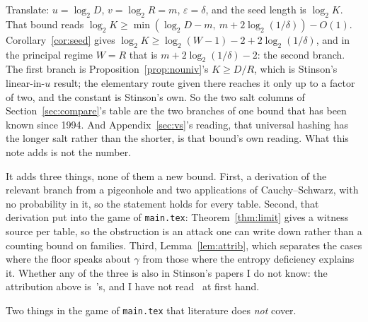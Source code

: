 \documentclass{aicr-solution}
\begin{document}
Translate: $u = \log_2 D$, $v = \log_2 R = m$, $\varepsilon = \delta$, and the seed length is
$\log_2 K$. That bound reads $\log_2 K \ge \min(\log_2 D - m,\ m + 2\log_2(1/\delta)) - O(1)$.
Corollary~\ref{cor:seed} gives $\log_2 K \ge \log_2(W-1) - 2 + 2\log_2(1/\delta)$, and in the
principal regime $W = R$ that is $m + 2\log_2(1/\delta) - 2$: the second branch. The first branch is
Proposition~\ref{prop:nouniv}'s $K \ge D/R$, which is Stinson's linear-in-$u$ result; the elementary
route given there reaches it only up to a factor of two, and the constant is Stinson's own. So the two salt columns of Section~\ref{sec:compare}'s table are the two branches of one bound
that has been known since 1994. And Appendix~\ref{sec:vs}'s reading, that universal hashing has the
longer salt rather than the shorter, is that bound's own reading. What this note adds is not the
number.

It adds three things, none of them a new bound. First, a derivation of the relevant branch from a
pigeonhole and two applications of Cauchy--Schwarz, with no probability in it, so the statement
holds for every table. Second, that derivation put into the game of \texttt{main.tex}:
Theorem~\ref{thm:limit} gives a witness source per table, so the obstruction is an attack one can
write down rather than a counting bound on families. Third, Lemma~\ref{lem:attrib}, which separates
the cases where the floor speaks about $\gamma$ from those where the entropy deficiency explains it.
Whether any of the three is also in Stinson's papers I do not know: the attribution above
is~\cite{BDKPPSY11}'s, and I have not read~\cite{Sti94} at first hand.

Two things in the game of \texttt{main.tex} that literature does \emph{not} cover.
\end{document}
